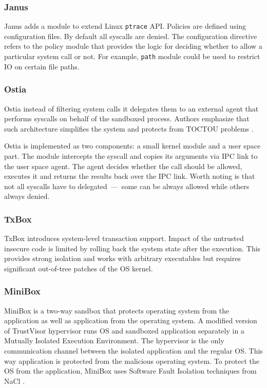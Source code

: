 \documentclass[en]{pracamgr}
\begin{document}
\subsubsection{Janus}
Janus \cite{garfinkel2004janus} adds a module to extend Linux \texttt{ptrace} API. Policies are defined using configuration files. By default all syscalls are denied. The configuration directive refers to the policy module that provides the logic for deciding whether to allow a particular system call or not. For example, \texttt{path} module could be used to restrict IO on certain file paths.

\subsubsection{Ostia}
Ostia \cite{garfinkel2004ostia} instead of filtering system calls it delegates them to an external agent that performs syscalls on behalf of the sandboxed process. Authors emphasize that such architecture simplifies the system and protects from TOCTOU problems \cite{cwe_toctou}.

Ostia is implemented as two components: a small kernel module and a user space part. The module intercepts the syscall and copies its arguments via IPC link to the user space agent. The agent decides whether the call should be allowed, executes it and returns the results back over the IPC link. Worth noting is that not all syscalls have to delegated~---~some can be always allowed while others always denied.

\subsubsection{TxBox}
TxBox \cite{jana2011txbox} introduces system-level transaction support. Impact of the untrusted insecure code is limited by rolling back the system state after the execution. This provides strong isolation and works with arbitrary executables but requires significant out-of-tree patches of the OS kernel.

\subsubsection{MiniBox}
MiniBox \cite{li2014minibox} is a two-way sandbox that protects operating system from the application as well as application from the operating system. A modified version of TrustVisor \cite{mccune2010trustvisor} hypervisor runs OS and sandboxed application separately in a Mutually Isolated Execution Environment. The hypervisor is the only communication channel between the isolated application and the regular OS. This way application is protected from the malicious operating system. To protect the OS from the application, MiniBox uses Software Fault Isolation techniques from NaCl \cite{yee2010native}.
\end{document}
